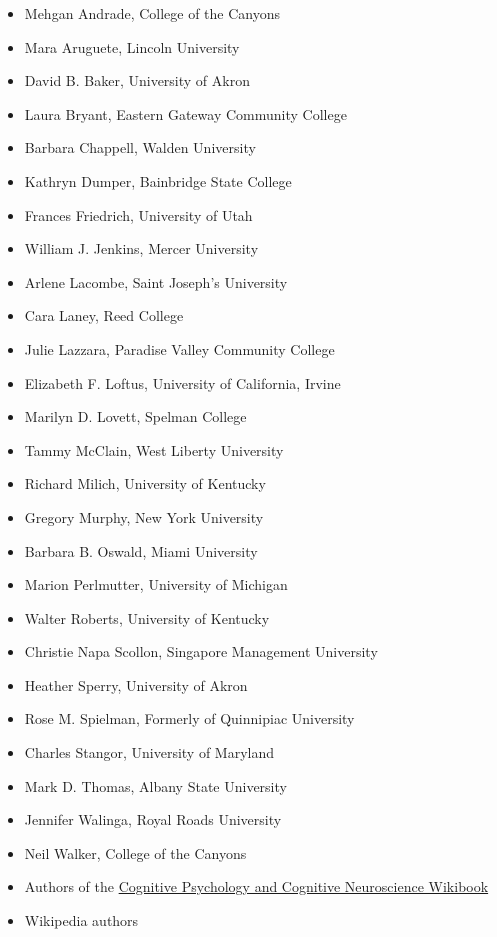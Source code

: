 \documentclass[
]{krantz}
\providecommand{\tightlist}{%
  \setlength{\itemsep}{0pt}\setlength{\parskip}{0pt}}
\begin{document}
\begin{itemize}
\tightlist
\item
  Mehgan Andrade, College of the Canyons
\item
  Mara Aruguete, Lincoln University
\item
  David B. Baker, University of Akron
\item
  Laura Bryant, Eastern Gateway Community College
\item
  Barbara Chappell, Walden University
\item
  Kathryn Dumper, Bainbridge State College
\item
  Frances Friedrich, University of Utah
\item
  William J. Jenkins, Mercer University
\item
  Arlene Lacombe, Saint Joseph's University
\item
  Cara Laney, Reed College
\item
  Julie Lazzara, Paradise Valley Community College
\item
  Elizabeth F. Loftus, University of California, Irvine
\item
  Marilyn D. Lovett, Spelman College
\item
  Tammy McClain, West Liberty University
\item
  Richard Milich, University of Kentucky
\item
  Gregory Murphy, New York University
\item
  Barbara B. Oswald, Miami University
\item
  Marion Perlmutter, University of Michigan
\item
  Walter Roberts, University of Kentucky
\item
  Christie Napa Scollon, Singapore Management University
\item
  Heather Sperry, University of Akron
\item
  Rose M. Spielman, Formerly of Quinnipiac University
\item
  Charles Stangor, University of Maryland
\item
  Mark D. Thomas, Albany State University
\item
  Jennifer Walinga, Royal Roads University
\item
  Neil Walker, College of the Canyons
\item
  Authors of the \href{https://en.wikibooks.org/wiki/Cognitive_Psychology_and_Cognitive_Neuroscience}{Cognitive Psychology and Cognitive Neuroscience Wikibook}
\item
  Wikipedia authors
\end{itemize}
\end{document}
